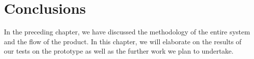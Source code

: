 \documentclass[11pt]{report}
\begin{document}
\chapter{Conclusions}

In the preceding chapter, we have discussed the methodology of the entire system and the flow of the product. In this chapter, we will elaborate on the results of our tests on the prototype as well as the further work we plan to undertake. 



    



\end{document}
